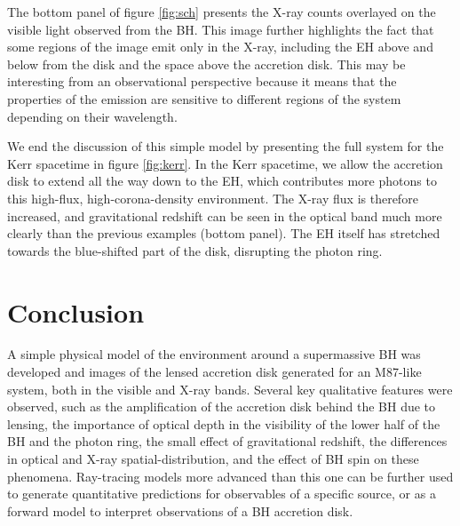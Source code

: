 \documentclass[twocolumn,twocolappendix]{aastex631}
\begin{document}
The bottom panel of figure \ref{fig:sch} presents the X-ray counts overlayed on the visible light observed from the BH. This image further highlights the fact that some regions of the image emit only in the X-ray, including the EH above and below from the disk and the space above the accretion disk. This may be interesting from an observational perspective because it means that the properties of the emission are sensitive to different regions of the system depending on their wavelength.
    
We end the discussion of this simple model by presenting the full system for the Kerr spacetime in figure \ref{fig:kerr}. In the Kerr spacetime, we allow the accretion disk to extend all the way down to the EH, which contributes more photons to this high-flux, high-corona-density environment. The X-ray flux is therefore increased, and gravitational redshift can be seen in the optical band much more clearly than the previous examples (bottom panel). The EH itself has stretched towards the blue-shifted part of the disk, disrupting the photon ring.

\section{Conclusion}

A simple physical model of the environment around a supermassive BH was developed and images of the lensed accretion disk generated for an M87-like system, both in the visible and X-ray bands. Several key qualitative features were observed, such as the amplification of the accretion disk behind the BH due to lensing, the importance of optical depth in the visibility of the lower half of the BH and the photon ring, the small effect of gravitational redshift, the differences in optical and X-ray spatial-distribution, and the effect of BH spin on these phenomena. Ray-tracing models more advanced than this one can be further used to generate quantitative predictions for observables of a specific source, or as a forward model to interpret observations of a BH accretion disk.
\end{document}
